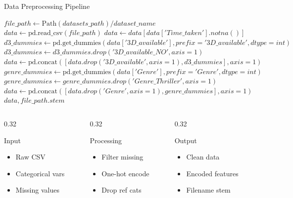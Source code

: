 
\begin{frame}{Data Preprocessing Pipeline}
\footnotesize
\begin{algorithmic}[1]
\State $file\_path \gets \text{Path}(datasets\_path) / dataset\_name$
\State $data \gets \text{pd.read\_csv}(file\_path)$
\State $data \gets data[data['Time\_taken'].notna()]$ 
\State $d3\_dummies \gets \text{pd.get\_dummies}(data['3D\_available'], prefix='3D\_available', dtype=int)$
\State $d3\_dummies \gets d3\_dummies.drop('3D\_available\_NO', axis=1)$
\State $data \gets \text{pd.concat}([data.drop('3D\_available', axis=1), d3\_dummies], axis=1)$
\State $genre\_dummies \gets \text{pd.get\_dummies}(data['Genre'], prefix='Genre', dtype=int)$
\State $genre\_dummies \gets genre\_dummies.drop('Genre\_Thriller', axis=1)$
\State $data \gets \text{pd.concat}([data.drop('Genre', axis=1), genre\_dummies], axis=1)$
\State \Return $data, file\_path.stem$
\EndFunction
\end{algorithmic}

\end{frame}
\begin{frame}

\vspace{0.3cm}
\begin{columns}[T]
\begin{column}{0.32\textwidth}
\begin{block}{Input}
\begin{itemize}
\footnotesize
\item Raw CSV
\item Categorical vars
\item Missing values
\end{itemize}
\end{block}
\end{column}

\begin{column}{0.32\textwidth}
\footnotesize
\begin{block}{Processing}
\begin{itemize}
\footnotesize
\item Filter missing
\item One-hot encode
\item Drop ref cats
\end{itemize}
\end{block}
\end{column}

\begin{column}{0.32\textwidth}
\footnotesize
\begin{block}{Output}
\begin{itemize}
\footnotesize
\item Clean data
\item Encoded features
\item Filename stem
\end{itemize}
\end{block}
\end{column}
\end{columns}
\end{frame}
